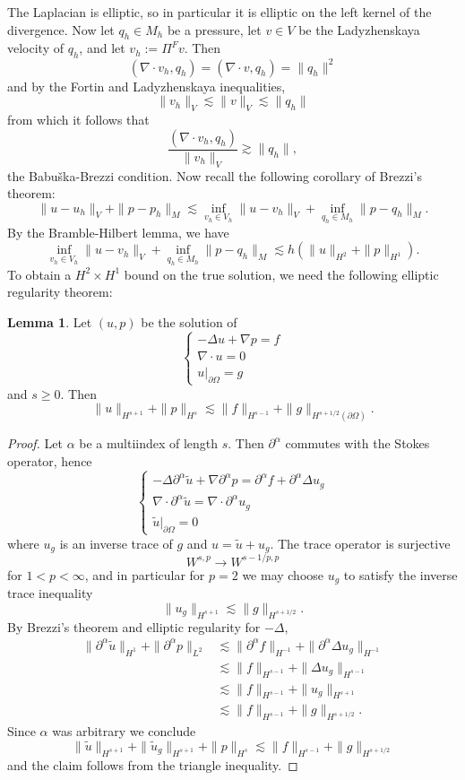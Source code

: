 \documentclass[10pt]{article}
\theoremstyle{definition}
\newtheorem{lemma}{Lemma}[exer]
\begin{document}
The Laplacian is elliptic, so in particular it is elliptic on the left kernel of the divergence.
Now let $q_h \in M_h$ be a pressure, let $v \in V$ be the Ladyzhenskaya velocity of $q_h$, and let $v_h := \Pi^F v$.
Then 
$$(\nabla \cdot v_h, q_h) = (\nabla \cdot v, q_h) = \|q_h\|^2$$
and by the Fortin and Ladyzhenskaya inequalities,
$$\|v_h\|_V \lesssim \|v\|_V \lesssim \|q_h\|$$
from which it follows that 
$$\frac{(\nabla \cdot v_h, q_h)}{\|v_h\|_V} \gtrsim \|q_h\|,$$
the Babuška-Brezzi condition. Now recall the following corollary of Brezzi's theorem:
$$\|u - u_h\|_V + \|p - p_h\|_M \lesssim \inf_{v_h \in V_h} \|u - v_h\|_V + \inf_{q_h \in M_h} \|p - q_h\|_M.$$
By the Bramble-Hilbert lemma, we have 
$$\inf_{v_h \in V_h} \|u - v_h\|_V + \inf_{q_h \in M_h} \|p - q_h\|_M \lesssim h\left(\|u\|_{H^2} + \|p\|_{H^1}\right).$$
To obtain a $H^2 \times H^1$ bound on the true solution, we need the following elliptic regularity theorem:

\begin{lemma}
Let $(u, p)$ be the solution of
$$\begin{cases}
    -\Delta u + \nabla p = f \\
    \nabla \cdot u = 0 \\
    u|_{\partial \Omega} = g
\end{cases}$$
and $s \geq 0$.
Then 
$$\|u\|_{H^{s + 1}} + \|p\|_{H^s} \lesssim \|f\|_{H^{s - 1}} + \|g\|_{H^{s + 1/2}(\partial \Omega)}.$$
\end{lemma}
\begin{proof}
Let $\alpha$ be a multiindex of length $s$. Then $\partial^\alpha$ commutes with the Stokes operator, hence 
$$\begin{cases}
    -\Delta \partial^\alpha \tilde u + \nabla \partial^\alpha p = \partial^\alpha f + \partial^\alpha \Delta u_g \\
    \nabla \cdot \partial^\alpha \tilde u = \nabla \cdot \partial^\alpha u_g \\
    \tilde u|_{\partial \Omega} = 0
\end{cases}$$
where $u_g$ is an inverse trace of $g$ and $u = \tilde u + u_g$. The trace operator is surjective 
$$W^{s, p} \to W^{s - 1/p, p}$$
for $1 < p < \infty$, and in particular for $p = 2$ we may choose $u_g$ to satisfy the inverse trace inequality
$$\|u_g\|_{H^{s + 1}} \lesssim \|g\|_{H^{s + 1/2}}.$$
By Brezzi's theorem and elliptic regularity for $-\Delta$,
\begin{align*}
    \|\partial^\alpha \tilde u\|_{H^1} + \|\partial^\alpha p\|_{L^2} &\lesssim \|\partial^\alpha f\|_{H^{-1}} + \|\partial^\alpha \Delta u_g\|_{H^{-1}} \\
    &\lesssim \|f\|_{H^{s - 1}} + \|\Delta u_g\|_{H^{s - 1}} \\
    &\lesssim \|f\|_{H^{s - 1}} + \|u_g\|_{H^{s + 1}} \\
    &\lesssim \|f\|_{H^{s - 1}} + \|g\|_{H^{s + 1/2}}.
\end{align*}
Since $\alpha$ was arbitrary we conclude 
$$\|\tilde u\|_{H^{s + 1}} + \|\tilde u_g\|_{H^{s + 1}} + \|p\|_{H^s} \lesssim \|f\|_{H^{s - 1}} + \|g\|_{H^{s + 1/2}}$$
and the claim follows from the triangle inequality.
\end{proof}
\end{document}
